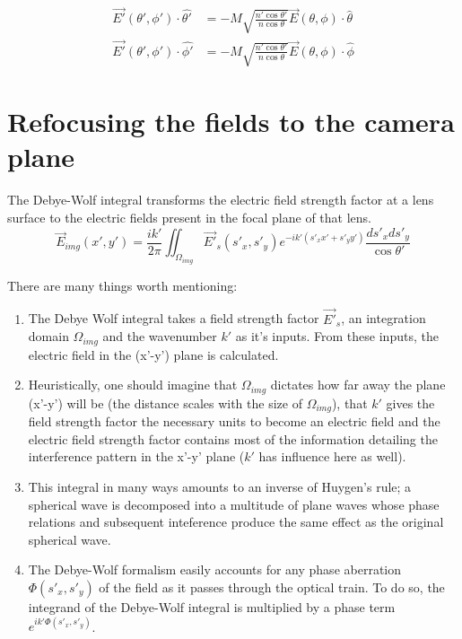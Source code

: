   \begin{equation*}
    \begin{split}
    \vec{E'}(\theta', \phi')\cdot\hat{\theta'} & = - M \sqrt{ \frac{n'\cos{\theta'}}{n\cos{\theta}}}\vec{E}(\theta, \phi)\cdot\hat{\theta}\\
    \vec{E'}(\theta', \phi')\cdot\hat{\phi'} & = - M \sqrt{ \frac{n'\cos{\theta'}}{n\cos{\theta}}}\vec{E}(\theta, \phi)\cdot\hat{\phi}
    \end{split}
  \end{equation*}

\section{Refocusing the fields to the camera plane}
The Debye-Wolf integral transforms the electric field strength factor at a lens
surface to the electric fields present in the focal plane of that lens.
\begin{equation*}
  \vec{E}_{img}(x', y') = \frac{i k'}{2 \pi} \iint_{\Omega_{img}} \vec{E'}_s(s'_x, s'_y) e^{-ik'(s'_xx'+s'_yy')}\frac{ds'_xds'_y}{\cos{\theta'}}
\end{equation*}

There are many things worth mentioning:
\begin{enumerate}
\item The Debye Wolf integral takes a field strength factor $\vec{E'}_s$,
  an integration domain $\Omega_{img}$ and the wavenumber $k'$ as it's inputs.
  From these inputs, the electric field in the (x'-y') plane is
  calculated. 
\item Heuristically, one should imagine that $\Omega_{img}$ dictates how far 
  away the plane (x'-y') will be (the distance scales with the size of 
  $\Omega_{img}$), that $k'$ gives the field strength factor the necessary 
  units to become an electric field and the electric field strength factor 
  contains most of the information detailing the interference pattern in the
  x'-y' plane ($k'$ has influence here as well).
\item This integral in many ways amounts to
  an inverse of Huygen's rule; a spherical wave is decomposed into a multitude 
  of plane waves whose phase relations and subsequent inteference produce
  the same effect as the original spherical wave.
\item The Debye-Wolf formalism easily accounts for any phase aberration 
  $\Phi(s'_x,s'_y)$ of the field as it passes through the optical train. To do so, the integrand
  of the Debye-Wolf integral is multiplied by a phase term $e^{ik'\Phi(s'_x,s'_y)}$.
\end{enumerate}

